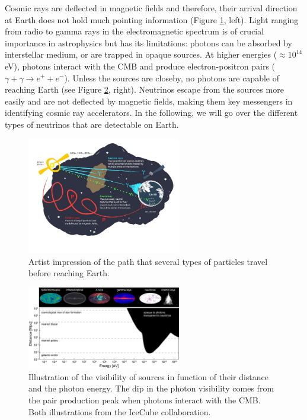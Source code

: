 Cosmic rays are deflected in magnetic fields and therefore, their arrival direction at Earth does not hold much pointing information (Figure \ref{fig:sourceinfo}, left). Light ranging from radio to gamma rays in the electromagnetic spectrum is of crucial importance in astrophysics but has its limitations: photons can be absorbed by interstellar medium, or are trapped in opaque sources. At higher energies ($\approx 10^{14}$ eV), photons interact with the CMB and produce electron-positron pairs ($\gamma + \gamma \rightarrow e^+ + e^-$). Unless the sources are closeby, no photons are capable of reaching Earth (see Figure \ref{fig:opaquephotons}, right). Neutrinos escape from the sources more easily and are not deflected by magnetic fields, making them key messengers in identifying cosmic ray accelerators. In the following, we will go over the different types of neutrinos that are detectable on Earth.


\begin{figure}[t]
\centering
\includegraphics[width=0.6\textwidth]{chapter3/img/sourceinformation_3.jpg}
\caption{Artist impression of the path that several types of particles travel before reaching Earth.}
\label{fig:sourceinfo}
\end{figure}

\begin{figure}[t]
\centering
\includegraphics[width=0.6\textwidth]{chapter3/img/opaque-to-photons.png}
\caption{Illustration of the visibility of sources in function of their distance and the photon energy. The dip in the photon visibility comes from the pair production peak when photons interact with the CMB. Both illustrations from the IceCube collaboration.}
\label{fig:opaquephotons}
\end{figure}

